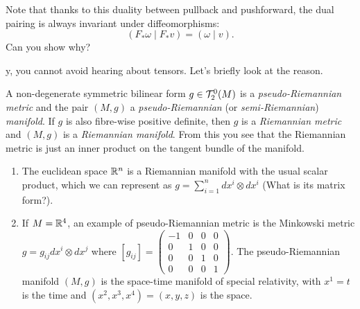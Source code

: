 Note that thanks to this duality between pullback and pushforward, the dual pairing is always invariant under diffeomorphisms:
\begin{equation}\label{eq:pairdualitypull}
  (F_* \omega \mid F_* v) = (\omega \mid v).
\end{equation}
Can you show why?

y, you cannot avoid hearing about tensors.
Let's briefly look at the reason.

\begin{definition}
  A non-degenerate symmetric bilinear form $g\in \mathcal{T}_2^0(M)$ is a \emph{pseudo-Riemannian metric} and the pair $(M,g)$ a \emph{pseudo-Riemannian} (or \emph{semi-Riemannian}) \emph{manifold}.
  If $g$ is also fibre-wise positive definite, then $g$ is a \emph{Riemannian metric} and $(M,g)$ is a \emph{Riemannian manifold}.
  From this you see that the Riemannian metric is just an inner product on the tangent bundle of the manifold.
\end{definition}

\begin{example}
  \begin{enumerate}
    \item The euclidean space $\mathbb{R}^n$ is a Riemannian manifold with the usual scalar product, which we can represent as $g = \sum_{i=1}^n dx^i\otimes dx^i$ (What is its matrix form?).
    \item If $M=\mathbb{R}^4$, an example of pseudo-Riemannian metric is the Minkowski metric $g = g_{ij} dx^i\otimes dx^j$ where $[g_{ij}] = {\left(\begin{smallmatrix} -1 & 0 & 0 & 0\\ 0 & 1 & 0 & 0 \\ 0 & 0 & 1 & 0 \\ 0 & 0 & 0 & 1 \end{smallmatrix}\right)}$. The pseudo-Riemannian manifold $(M, g)$ is the space-time manifold of special relativity, with $x^1 = t$ is the time and $(x^2, x^3, x^4) = (x,y,z)$ is the space.
  \end{enumerate}
\end{example}

